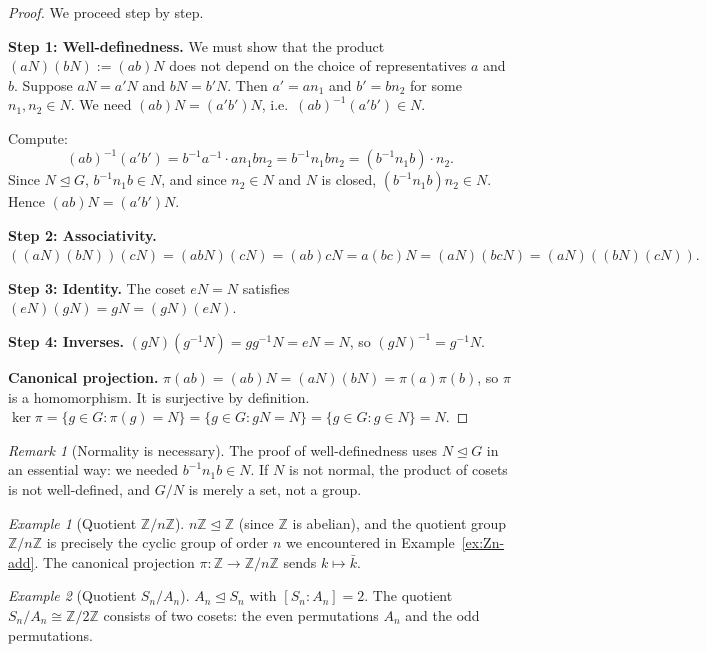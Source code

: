 \documentclass[12pt,a4paper,openany]{book}
\theoremstyle{definition}
\theoremstyle{remark}
\newtheorem{remark}{Remark}[chapter]
\newtheorem{example}{Example}[chapter]
\newcommand{\Z}{\mathbb{Z}}
\begin{document}
\begin{proof}
We proceed step by step.

\smallskip
\noindent\textbf{Step 1: Well-definedness.}  We must show that the product
$(aN)(bN):=(ab)N$ does not depend on the choice of representatives $a$ and
$b$.  Suppose $aN=a'N$ and $bN=b'N$.  Then $a'=an_1$ and $b'=bn_2$ for
some $n_1,n_2\in N$.  We need $(ab)N=(a'b')N$, i.e.\
$(ab)^{-1}(a'b')\in N$.

Compute:
\[
  (ab)^{-1}(a'b') = b^{-1}a^{-1}\cdot an_1bn_2
  = b^{-1}n_1bn_2
  = (b^{-1}n_1b)\cdot n_2.
\]
Since $N\trianglelefteq G$, $b^{-1}n_1b\in N$, and since $n_2\in N$ and $N$
is closed, $(b^{-1}n_1b)n_2\in N$.  Hence $(ab)N=(a'b')N$.

\smallskip
\noindent\textbf{Step 2: Associativity.}
$((aN)(bN))(cN)=(abN)(cN)=(ab)cN=a(bc)N=(aN)(bcN)=(aN)((bN)(cN)).$

\smallskip
\noindent\textbf{Step 3: Identity.}  The coset $eN=N$ satisfies
$(eN)(gN)=gN=(gN)(eN)$.

\smallskip
\noindent\textbf{Step 4: Inverses.}  $(gN)(g^{-1}N)=gg^{-1}N=eN=N$, so
$(gN)^{-1}=g^{-1}N$.

\smallskip
\noindent\textbf{Canonical projection.}  $\pi(ab)=(ab)N=(aN)(bN)=
\pi(a)\pi(b)$, so $\pi$ is a homomorphism.  It is surjective by definition.
$\ker\pi=\{g\in G:\pi(g)=N\}=\{g\in G:gN=N\}=\{g\in G:g\in N\}=N$.
\end{proof}

\begin{remark}[Normality is necessary]
\label{rem:normality-necessary}
The proof of well-definedness uses $N\trianglelefteq G$ in an essential way:
we needed $b^{-1}n_1b\in N$.  If $N$ is not normal, the product of cosets
is not well-defined, and $G/N$ is merely a set, not a group.
\end{remark}

\begin{example}[Quotient $\Z/n\Z$]
\label{ex:quotient-Z-nZ}
$n\Z\trianglelefteq\Z$ (since $\Z$ is abelian), and the quotient group
$\Z/n\Z$ is precisely the cyclic group of order $n$ we encountered in
Example~\ref{ex:Zn-add}.  The canonical projection $\pi\colon\Z\to\Z/n\Z$
sends $k\mapsto\bar k$.
\end{example}

\begin{example}[Quotient $S_n/A_n$]
\label{ex:quotient-Sn-An}
$A_n\trianglelefteq S_n$ with $[S_n:A_n]=2$.  The quotient
$S_n/A_n\cong\Z/2\Z$ consists of two cosets: the even permutations $A_n$
and the odd permutations.
\end{example}
\end{document}
